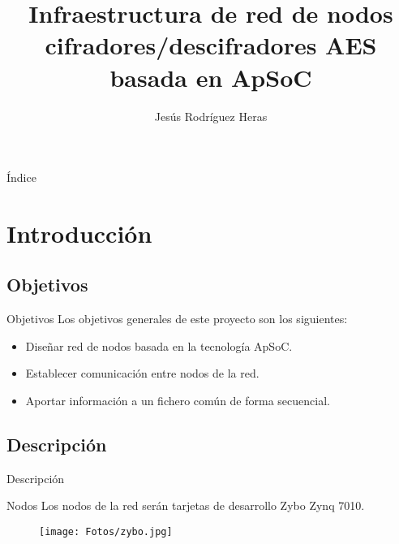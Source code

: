 \documentclass[aspectratio=169]{beamer}
\title{Infraestructura de red de nodos cifradores/descifradores AES basada en ApSoC}
\author{Jesús Rodríguez Heras}
\begin{document}
\begin{frame}
  \titlepage
  
\end{frame}

\begin{frame}{Índice}
\tableofcontents
\end{frame}

\section{Introducción}
\subsection{Objetivos}
\begin{frame}{Objetivos}
Los objetivos generales de este proyecto son los siguientes:
\begin{itemize}
	\item Diseñar red de nodos basada en la tecnología ApSoC.
	\item Establecer comunicación entre nodos de la red.
	\item Aportar información a un fichero común de forma secuencial.
\end{itemize}
\end{frame}

\subsection{Descripción}
\begin{frame}{Descripción}
\begin{block}{Nodos}
	Los nodos de la red serán tarjetas de desarrollo Zybo Zynq 7010.
\end{block}
\begin{figure}[h]
	\centering
	\texttt{[image: Fotos/zybo.jpg]}
\end{figure}
\end{frame}
\end{document}
